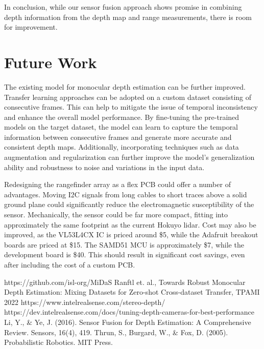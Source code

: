 \documentclass[conference]{IEEEtran}
\begin{document}
In conclusion, while our sensor fusion approach shows promise in combining depth information from the depth map and range measurements, there is room for improvement. 

\section{Future Work}
The existing model for monocular depth estimation can be further improved. Transfer learning approaches can be adopted on a custom dataset consisting of consecutive frames. This can help to mitigate the issue of temporal inconsistency and enhance the overall model performance. By fine-tuning the pre-trained models on the target dataset, the model can learn to capture the temporal information between consecutive frames and generate more accurate and consistent depth maps. Additionally, incorporating techniques such as data augmentation and regularization can further improve the model's generalization ability and robustness to noise and variations in the input data.

Redesigning the rangefinder array as a flex PCB could offer a number of
advantages. Moving I2C signals from long cables to short traces above a solid
ground plane could significantly reduce the electromagnetic susceptibility of
the sensor. Mechanically, the sensor could be far more compact, fitting into
approximately the same footprint as the current Hokuyo lidar. Cost may also be
improved, as the VL53L4CX IC is priced around \$5, while the Adafruit breakout
boards are priced at \$15. The SAMD51 MCU is approximately \$7, while the
development board is \$40. This should result in significant cost savings, even
after including the cost of a custom PCB.





\begin{thebibliography}{00}
 https://github.com/isl-org/MiDaS
 Ranftl et. al., Towards Robust Monocular Depth Estimation:
Mixing Datasets for Zero-shot Cross-dataset Transfer, TPAMI 2022
 https://www.intelrealsense.com/stereo-depth/
 https://dev.intelrealsense.com/docs/tuning-depth-cameras-for-best-performance
Li, Y., \& Ye, J. (2016). Sensor Fusion for Depth Estimation: A Comprehensive Review. Sensors, 16(4), 419.
Thrun, S., Burgard, W., \& Fox, D. (2005). Probabilistic Robotics. MIT Press.

\end{thebibliography}
\end{document}
